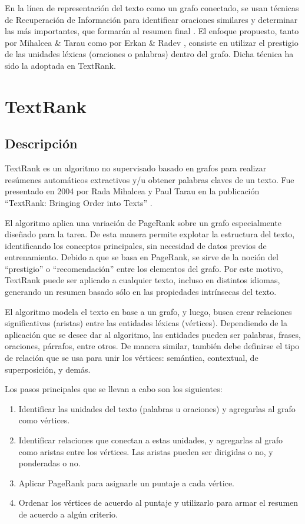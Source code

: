 \documentclass{llncs}
\begin{document}
En la línea de representación del texto como un grafo conectado, se usan técnicas de Recuperación de Información para identificar oraciones similares y determinar las más importantes, que formarán al resumen final \cite{salton}. El enfoque propuesto, tanto por Mihalcea \& Tarau como por Erkan \& Radev \cite{erkan}, consiste en utilizar el prestigio de las unidades léxicas (oraciones o palabras) dentro del grafo. Dicha técnica ha sido la adoptada en TextRank.


\section{TextRank}

\subsection{Descripción}
TextRank es un algoritmo no supervisado basado en grafos para realizar resúmenes automáticos extractivos y/u obtener palabras claves de un texto. Fue presentado en 2004 por Rada Mihalcea y Paul Tarau en la publicación “TextRank: Bringing Order into Texts” \cite{mihalcea-tarau}.

El algoritmo aplica una variación de PageRank \cite{pageetal98} sobre un grafo especialmente diseñado para la tarea. De esta manera permite explotar la estructura del texto, identificando los conceptos principales, sin necesidad de datos previos de entrenamiento. Debido a que se basa en PageRank, se sirve de la noción del “prestigio” o “recomendación” entre los elementos del grafo. Por este motivo, TextRank puede ser aplicado a cualquier texto, incluso en distintos idiomas, generando un resumen basado sólo en las propiedades intrínsecas del texto.

El algoritmo modela el texto en base a un grafo, y luego, busca crear relaciones significativas (aristas) entre las entidades léxicas (vértices). Dependiendo de la aplicación que se desee dar al algoritmo, las entidades pueden ser palabras, frases, oraciones, párrafos, entre otros. De manera similar, también debe definirse el tipo de relación que se usa para unir los vértices: semántica, contextual, de superposición, y demás.

Los pasos principales que se llevan a cabo son los siguientes:

\begin{enumerate}
\item Identificar las unidades del texto (palabras u oraciones) y agregarlas al grafo como vértices.
\item Identificar relaciones que conectan a estas unidades, y agregarlas al grafo como aristas entre los vértices. Las aristas pueden ser dirigidas o no, y ponderadas o no.
\item Aplicar PageRank para asignarle un puntaje a cada vértice.
\item Ordenar los vértices de acuerdo al puntaje y utilizarlo para armar el resumen de acuerdo a algún criterio.
\end{enumerate}
\end{document}
